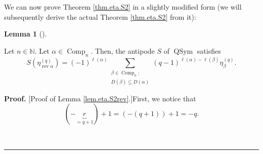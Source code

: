 \documentclass[numbers=enddot,12pt,final,onecolumn,notitlepage]{scrartcl}%
\theoremstyle{definition}
\newtheorem{lem}[theo]{Lemma}
\newenvironment{lemma}[1][]
{\begin{lem}[#1]\begin{leftbar}}
{\end{leftbar}\end{lem}}
\newenvironment{proof}[1][Proof]{\noindent\textbf{#1.} }{\ \rule{0.5em}{0.5em}}
\let\sumnonlimits\sum
\renewcommand{\sum}{\sumnonlimits\limits}
\newenvironment{verlong}{}{}
\begin{document}
\begin{verlong}
We can now prove Theorem \ref{thm.eta.S2} in a slightly modified form (we will
subsequently derive the actual Theorem \ref{thm.eta.S2} from it):

\begin{lemma}
\label{lem.eta.S2rev}Let $n\in\mathbb{N}$. Let $\alpha\in\operatorname*{Comp}%
\nolimits_{n}$. Then, the antipode $S$ of $\operatorname*{QSym}$ satisfies
\[
S\left(  \eta_{\operatorname*{rev}\alpha}^{\left(  q\right)  }\right)
=\left(  -1\right)  ^{\ell\left(  \alpha\right)  }\sum_{\substack{\beta
\in\operatorname*{Comp}\nolimits_{n};\\D\left(  \beta\right)  \subseteq
D\left(  \alpha\right)  }}\left(  q-1\right)  ^{\ell\left(  \alpha\right)
-\ell\left(  \beta\right)  }\eta_{\beta}^{\left(  q\right)  }.
\]

\end{lemma}

\begin{proof}
[Proof of Lemma \ref{lem.eta.S2rev}.]First, we notice that
\[
\left(  -\underbrace{r}_{=q+1}\right)  +1=\left(  -\left(  q+1\right)
\right)  +1=-q.
\]



\end{proof}
\end{verlong}
\end{document}

